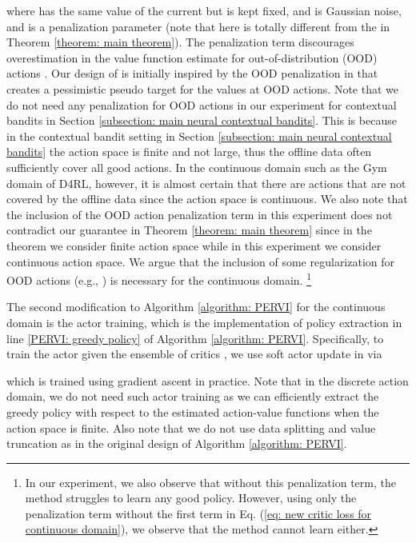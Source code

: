 \documentclass{article} \usepackage{iclr2023/iclr2023_conference,times}
\begin{document}
where  has the same value of the current  but is kept fixed,  and  is Gaussian noise, and  is a penalization parameter (note that  here is totally different from the  in Theorem \ref{theorem: main theorem}). The penalization term  discourages overestimation in the value function estimate  for out-of-distribution (OOD) actions . Our design of  is initially inspired by the OOD penalization in \cite{bai2022pessimistic} that creates a pessimistic pseudo target for the values at OOD actions. Note that we do not need any penalization for OOD actions in our experiment for contextual bandits in Section \ref{subsection: main neural contextual bandits}. This is because in the contextual bandit setting in Section \ref{subsection: main neural contextual bandits} the action space is finite and not large, thus the offline data often sufficiently cover all good actions. In the continuous domain such as the Gym domain of D4RL, however, it is almost certain that there are actions that are not covered by the offline data since the action space is continuous. We also note that the inclusion of the OOD action penalization term  in this experiment does not contradict our guarantee in Theorem \ref{theorem: main theorem} since in the theorem we consider finite action space while in this experiment we consider continuous action space.  We argue that the inclusion of some regularization for OOD actions (e.g., ) is necessary for the continuous domain. \footnote{In our experiment, we also observe that without this penalization term, the method struggles to learn any good policy. However, using only the penalization term without the first term in Eq. (\ref{eq: new critic loss for continuous domain}), we observe that the method cannot learn either.}



The second modification to Algorithm \ref{algorithm: PERVI} for the continuous domain is the actor training, which is the implementation of policy extraction in line \ref{PERVI: greedy policy}  of Algorithm \ref{algorithm: PERVI}. Specifically, to train the actor  given the ensemble of critics ,  we use soft actor update in \cite{haarnoja2018soft} via

which is trained using gradient ascent in practice. Note that in the discrete action domain, we do not need such actor training as we can efficiently extract the greedy policy with respect to the estimated action-value functions when the action space is finite. Also note that we do not use data splitting and value truncation as in the original design of Algorithm \ref{algorithm: PERVI}. 
\end{document}
